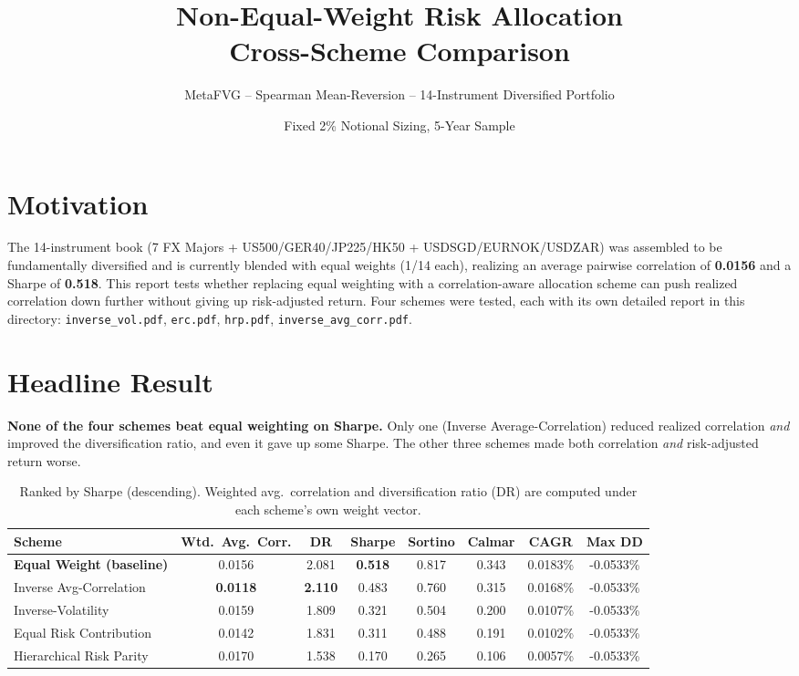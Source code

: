 \documentclass[11pt]{article}
\title{\bfseries Non-Equal-Weight Risk Allocation \\ Cross-Scheme Comparison}
\author{MetaFVG -- Spearman Mean-Reversion -- 14-Instrument Diversified Portfolio}
\date{Fixed 2\% Notional Sizing, 5-Year Sample}
\begin{document}
\maketitle

\section*{Motivation}
The 14-instrument book (7 FX Majors + US500/GER40/JP225/HK50 + USDSGD/EURNOK/USDZAR) was assembled to be fundamentally diversified and is currently blended with equal weights (1/14 each), realizing an average pairwise correlation of \textbf{0.0156} and a Sharpe of \textbf{0.518}. This report tests whether replacing equal weighting with a correlation-aware allocation scheme can push realized correlation down further without giving up risk-adjusted return. Four schemes were tested, each with its own detailed report in this directory: \texttt{inverse\_vol.pdf}, \texttt{erc.pdf}, \texttt{hrp.pdf}, \texttt{inverse\_avg\_corr.pdf}.

\section*{Headline Result}
\textbf{None of the four schemes beat equal weighting on Sharpe.} Only one (Inverse Average-Correlation) reduced realized correlation \emph{and} improved the diversification ratio, and even it gave up some Sharpe. The other three schemes made both correlation \emph{and} risk-adjusted return worse.

\begin{table}[h]
\centering
\caption*{Ranked by Sharpe (descending). Weighted avg.\ correlation and diversification ratio (DR) are computed under each scheme's own weight vector.}
\begin{tabular}{lccccccc}
\toprule
Scheme & Wtd.\ Avg.\ Corr. & DR & Sharpe & Sortino & Calmar & CAGR & Max DD \\
\midrule
\textbf{Equal Weight (baseline)} & 0.0156 & 2.081 & \textbf{0.518} & 0.817 & 0.343 & 0.0183\% & -0.0533\% \\
Inverse Avg-Correlation & \textbf{0.0118} & \textbf{2.110} & 0.483 & 0.760 & 0.315 & 0.0168\% & -0.0533\% \\
Inverse-Volatility & 0.0159 & 1.809 & 0.321 & 0.504 & 0.200 & 0.0107\% & -0.0533\% \\
Equal Risk Contribution & 0.0142 & 1.831 & 0.311 & 0.488 & 0.191 & 0.0102\% & -0.0533\% \\
Hierarchical Risk Parity & 0.0170 & 1.538 & 0.170 & 0.265 & 0.106 & 0.0057\% & -0.0533\% \\
\bottomrule
\end{tabular}
\end{table}
\end{document}

